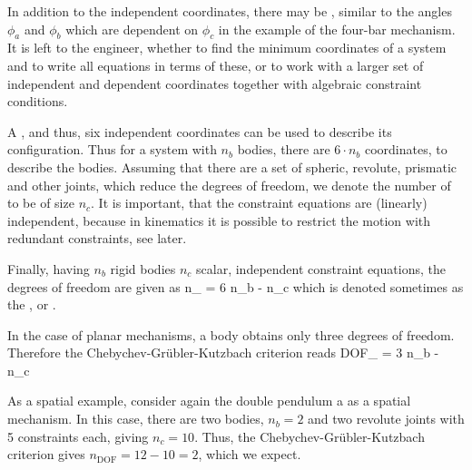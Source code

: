 In addition to the independent coordinates, there may be , similar to the angles $\phi_a$ and $\phi_b$ which are dependent on $\phi_c$ in the example of the four-bar mechanism. It is left to the engineer, whether to find the minimum coordinates of a system and to write all equations in terms of these, or to work with a larger set of independent and dependent coordinates together with algebraic constraint conditions.

A , and thus, six independent coordinates can be used to describe its configuration.
Thus for a system with $n_b$ bodies, there are $6 \cdot n_b$ coordinates, to describe the bodies.
Assuming that there are a set of spheric, revolute, prismatic and other joints, which reduce the degrees of freedom, we denote the number of  to be of size $n_c$.
It is important, that the constraint equations are (linearly) independent, because in kinematics it is possible to restrict the motion with redundant constraints, see later.

Finally, having $n_b$ rigid bodies $n_c$ scalar, independent constraint equations, the degrees of freedom are given as
\be \label{eq:Chebychev:Grubler:Kutzbach}
  n_ = 6 \cdot n_b - n_c
\ee
which is denoted sometimes as the , or . 

In the case of planar mechanisms, a body obtains only three degrees of freedom. Therefore the Chebychev-Gr\"ubler-Kutzbach criterion reads
\be
  DOF_ = 3 \cdot n_b - n_c
\ee

As a spatial example, consider again the double pendulum a as a spatial mechanism.
In this case, there are two bodies, $n_b=2$ and two revolute joints with 5 constraints each, giving $n_c=10$. Thus, the Chebychev-Gr\"ubler-Kutzbach criterion gives $n_\mathrm{DOF} = 12 - 10 = 2$, which we expect.

